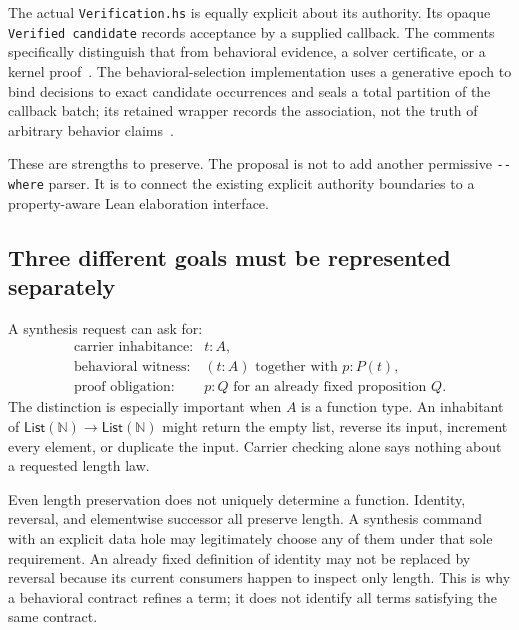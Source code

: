 \documentclass[11pt,letterpaper]{article}
\newcommand{\code}[1]{\nolinkurl{#1}}
\newcommand{\N}{\mathbb N}
\theoremstyle{definition}
\theoremstyle{remark}
\begin{document}
The actual \code{Verification.hs} is equally explicit about its authority. Its
opaque \code{Verified candidate} records acceptance by a supplied callback. The
comments specifically distinguish that from behavioral evidence, a solver
certificate, or a kernel proof~\cite{LeantVerification}. The behavioral-selection
implementation uses a generative epoch to bind decisions to exact candidate
occurrences and seals a total partition of the callback batch; its retained
wrapper records the association, not the truth of arbitrary behavior
claims~\cite{LeantSelect}.

These are strengths to preserve. The proposal is not to add another permissive
\code{--where} parser. It is to connect the existing explicit authority boundaries
to a property-aware Lean elaboration interface.

\subsection{Three different goals must be represented separately}
A synthesis request can ask for:
\[
\begin{array}{ll}
\text{carrier inhabitance:} & t:A,\\
\text{behavioral witness:} & (t:A)\text{ together with }p:P(t),\\
\text{proof obligation:} & p:Q\text{ for an already fixed proposition }Q.
\end{array}
\tag{17}
\]
The distinction is especially important when $A$ is a function type. An
inhabitant of $\mathsf{List}(\N)\to\mathsf{List}(\N)$ might return the empty list,
reverse its input, increment every element, or duplicate the input. Carrier
checking alone says nothing about a requested length law.

Even length preservation does not uniquely determine a function. Identity,
reversal, and elementwise successor all preserve length. A synthesis command
with an explicit data hole may legitimately choose any of them under that sole
requirement. An already fixed definition of identity may not be replaced by
reversal because its current consumers happen to inspect only length. This is
why a behavioral contract refines a term; it does not identify all terms
satisfying the same contract.
\end{document}
